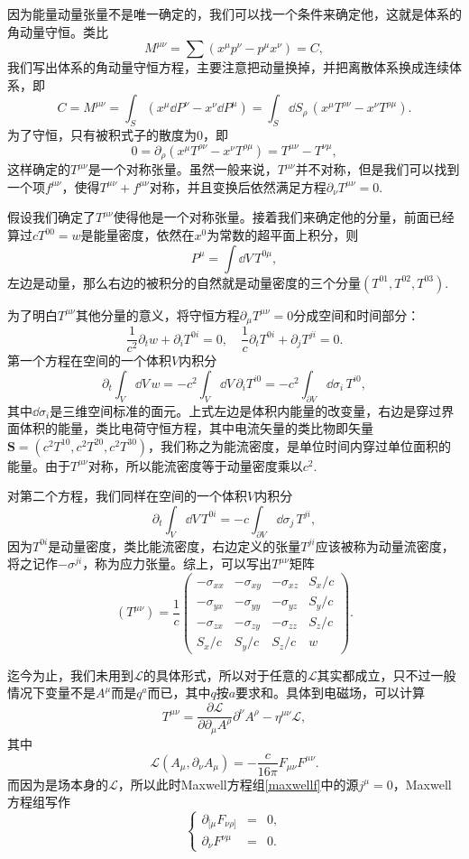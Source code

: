 \documentclass[9pt]{extbook}
\begin{document}
因为能量动量张量不是唯一确定的，我们可以找一个条件来确定他，这就是体系的角动量守恒。类比
\[
	M^{\mu\nu}=\sum (x^\mu p^\nu-p^\mu x^\nu)=C,
\]
我们写出体系的角动量守恒方程，主要注意把动量换掉，并把离散体系换成连续体系，即
\[
	C=M^{\mu\nu}=\int_S (x^\mu \dd P^\nu-x^\nu\dd P^\mu)=\int_S\dd S_\rho\, (x^\mu T^{\rho\nu}-x^\nu T^{\rho\mu}).
\]
为了守恒，只有被积式子的散度为0，即
\[
	0=\partial_\rho(x^\mu T^{\rho\nu}-x^\nu T^{\rho\mu})=T^{\mu\nu}-T^{\nu\mu},
\]
这样确定的$T^{\mu\nu}$是一个对称张量。虽然一般来说，$T^{\mu\nu}$并不对称，但是我们可以找到一个项$f^{\mu\nu}$，使得$T^{\mu\nu}+f^{\mu\nu}$对称，并且变换后依然满足方程$\partial_\nu T^{\mu\nu}=0$.

假设我们确定了$T^{\mu\nu}$使得他是一个对称张量。接着我们来确定他的分量，前面已经算过$cT^{00}=w$是能量密度，依然在$x^0$为常数的超平面上积分，则
\[
	P^\mu=\int \dd V\,T^{0 \mu},
\]
左边是动量，那么右边的被积分的自然就是动量密度的三个分量$\left(T^{01},T^{02},T^{03}\right)$.

为了明白$T^{\mu\nu}$其他分量的意义，将守恒方程$\partial_\mu T^{\mu\nu}=0$分成空间和时间部分：
\[
	\frac{1}{c^2}\partial_t w+\partial_i T^{0i}=0,\quad \frac{1}{c}\partial_t T^{0i}+\partial_j T^{ji}=0.
\]
第一个方程在空间的一个体积$V$内积分
\[
	\partial_t\int_V \dd V\,w=-c^2\int_{V}\dd V\,\partial_i T^{i0} =-c^2\int_{\partial V}\dd\sigma_i\,T^{i0},
\]
其中$\dd\sigma_i$是三维空间标准的面元。上式左边是体积内能量的改变量，右边是穿过界面体积的能量，类比电荷守恒方程，其中电流矢量的类比物即矢量$\bm{S}=(c^2T^{10},c^2T^{20},c^2T^{30})$，我们称之为能流密度，是单位时间内穿过单位面积的能量。由于$T^{\mu\nu}$对称，所以能流密度等于动量密度乘以$c^2$.

对第二个方程，我们同样在空间的一个体积$V$内积分
\[
	\partial_t\int_V \dd V\,T^{0i}=-c\int_{\partial V}\dd\sigma_j\,T^{ji},
\]
因为$T^{0i}$是动量密度，类比能流密度，右边定义的张量$T^{ji}$应该被称为动量流密度，将之记作$-\sigma^{ji}$，称为应力张量。综上，可以写出$T^{\mu\nu}$矩阵
\[
	(T^{\mu\nu})=\frac{1}{c}
	\begin{pmatrix}
	-\sigma_{xx}&-\sigma_{xy}&-\sigma_{xz}&S_x/c\\
	-\sigma_{yx}&-\sigma_{yy}&-\sigma_{yz}&S_y/c\\
	-\sigma_{zx}&-\sigma_{zy}&-\sigma_{zz}&S_z/c\\
	S_x/c&S_y/c&S_z/c&w
	\end{pmatrix}.
\]

迄今为止，我们未用到$\mathcal{L}$的具体形式，所以对于任意的$\mathcal{L}$其实都成立，只不过一般情况下变量不是$A^\mu$而是$q^a$而已，其中$q$按$a$要求和。具体到电磁场，可以计算
\[
	T^{\mu\nu}=\frac{\partial \mathcal{L}}{\partial \partial_\mu A^\rho}\partial^\nu A^\rho-\eta^{\mu\nu} \mathcal{L},
\]
其中
\[
	\mathcal{L}(A_\mu,\partial_\nu A_\mu)=-\frac{c}{16\pi}F_{\mu\nu}F^{\mu\nu}.
\]
而因为是场本身的$\mathcal{L}$，所以此时Maxwell方程组\eqref{maxwellf}中的源$j^\mu=0$，Maxwell方程组写作
\[
\left\{
\begin{array}{lcl}
	\partial_{[\mu}F_{\nu\rho]}&=&0,\\
	\partial_\nu F^{\nu\mu}&=&0.
\end{array}
\right.
\]
\end{document}
